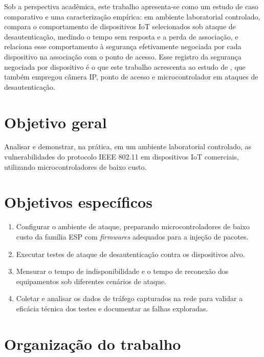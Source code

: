 Sob a perspectiva acadêmica, este trabalho apresenta-se como um estudo de caso comparativo e uma caracterização empírica: em ambiente laboratorial controlado, compara o comportamento de dispositivos IoT selecionados sob ataque de desautenticação, medindo o tempo sem resposta e a perda de associação, e relaciona esse comportamento à segurança efetivamente negociada por cada dispositivo na associação com o ponto de acesso. Esse registro da segurança negociada por dispositivo é o que este trabalho acrescenta ao estudo de , que também empregou câmera IP, ponto de acesso e microcontrolador em ataques de desautenticação.

\section{Objetivo geral}

Analisar e demonstrar, na prática, em um ambiente laboratorial controlado, as vulnerabilidades do protocolo IEEE 802.11 em dispositivos IoT comerciais, utilizando microcontroladores de baixo custo.

\section{Objetivos específicos}

\begin{enumerate}[label=\arabic*.]
    \item Configurar o ambiente de ataque, preparando microcontroladores de baixo custo da família ESP com \textit{firmwares} adequados para a injeção de pacotes.
    \item Executar testes de ataque de desautenticação contra os dispositivos alvo.
    \item Mensurar o tempo de indisponibilidade e o tempo de reconexão dos equipamentos sob diferentes cenários de ataque.
    \item Coletar e analisar os dados de tráfego capturados na rede para validar a eficácia técnica dos testes e documentar as falhas exploradas.
\end{enumerate}

\section{Organização do trabalho}

